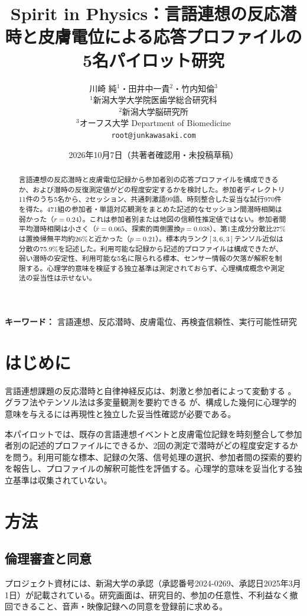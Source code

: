 \documentclass[a4paper,11pt]{article}
\title{Spirit in Physics：言語連想の反応潜時と皮膚電位による応答プロファイルの5名パイロット研究}
\author{川崎 純$^{1}$・田井中一貴$^{2}$・竹内知倫$^{3}$\\
\small $^{1}$新潟大学大学院医歯学総合研究科\\
\small $^{2}$新潟大学脳研究所\\
\small $^{3}$オーフス大学 Department of Biomedicine\\
\small \texttt{root@junkawasaki.com}}
\date{2026年10月7日（共著者確認用・未投稿草稿）}
\begin{document}
\maketitle
\begin{abstract}
言語連想の反応潜時と皮膚電位記録から参加者別の応答プロファイルを構成できるか、および潜時の反復測定値がどの程度安定するかを検討した。参加者ディレクトリ11件のうち5名から、2セッション、共通刺激語99語、時刻整合した妥当な試行970件を得た。471組の参加者・単語対応観測をまとめた記述的なセッション間潜時相関は弱かった（$r=0.24$）。これは参加者別または地図の信頼性推定値ではない。参加者間平均潜時相関は小さく（$\bar r=0.065$、探索的両側置換$p=0.038$）、第1主成分分散比27\%は置換帰無平均約26\%と近かった（$p=0.21$）。標本内ランク$[3,6,3]$テンソル近似は分散の75.9\%を記述した。利用可能な記録から記述的プロファイルは構成できたが、弱い潜時の安定性、利用可能な5名に限られる標本、センサー情報の欠落が解釈を制限する。心理学的意味を検証する独立基準は測定されておらず、心理構成概念や測定法の妥当性は示せない。
\end{abstract}

\noindent\textbf{キーワード：} 言語連想、反応潜時、皮膚電位、再検査信頼性、実行可能性研究

\section{はじめに}
言語連想課題の反応潜時と自律神経反応は、刺激と参加者によって変動する \cite{Jung1910}。グラフ法やテンソル法は多変量観測を要約できる \cite{KoldaBader2009} が、構成した幾何に心理学的意味を与えるには再現性と独立した妥当性確認が必要である。

本パイロットでは、既存の言語連想イベントと皮膚電位記録を時刻整合して参加者別の記述的プロファイルにできるか、2回の測定で潜時がどの程度安定するかを問う。利用可能な標本、記録の欠落、信号処理の選択、参加者間の探索的要約を報告し、プロファイルの解釈可能性を評価する。心理学的意味を妥当化する独立基準は収集されていない。

\section{方法}
\subsection{倫理審査と同意}
プロジェクト資材には、新潟大学の承認（承認番号2024-0269、承認日2025年3月1日）が記載されている。研究画面は、研究目的、参加の任意性、不利益なく撤回できること、音声・映像記録への同意を登録前に求める。
\end{document}
